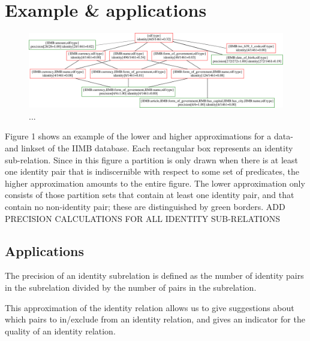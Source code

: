 \section{Example \& applications}

\begin{figure}
\label{fig:ihierarchy}
\centering
\includegraphics[width=\textwidth]{./img/iimb_16}
\caption{...}
\end{figure}

Figure 1 shows an example of the lower and higher
  approximations for a data- and linkset of the IIMB database.
Each rectangular box represents an identity sub-relation.
Since in this figure a partition is only drawn when there is at least one
  identity pair that is indiscernible with respect to some set of
  predicates, the higher approximation amounts to the entire figure.
The lower approximation only consists of those partition sets that contain
  at least one identity pair, and that contain no non-identity pair;
  these are distinguished by green borders.
ADD PRECISION CALCULATIONS FOR ALL IDENTITY SUB-RELATIONS

\subsection{Applications}

The precision of an identity subrelation is defined as
    the number of identity pairs in the subrelation
  divided by
    the number of pairs in the subrelation.

This approximation of the identity relation allows us to
  give suggestions about which pairs to in/exclude from
  an identity relation, and
  gives an indicator for the quality of an identity relation.

